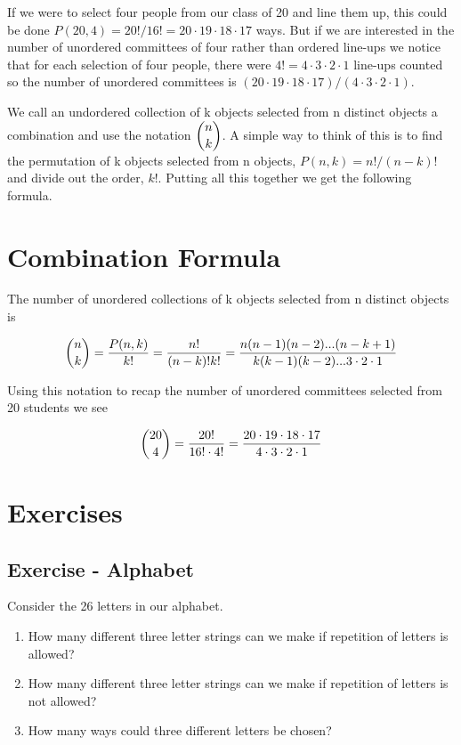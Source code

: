 \documentclass[]{book}
\theoremstyle{definition}
\theoremstyle{definition}
\theoremstyle{definition}
\theoremstyle{remark}
\begin{document}
If we were to select four people from our class of 20 and line them up,
this could be done \(P(20,4)=20!/16!=20 \cdot 19 \cdot 18 \cdot 17\)
ways. But if we are interested in the number of unordered committees of
four rather than ordered line-ups we notice that for each selection of
four people, there were \(4!=4 \cdot 3 \cdot 2 \cdot 1\) line-ups
counted so the number of unordered committees is
\((20 \cdot 19 \cdot 18 \cdot 17)/(4 \cdot 3 \cdot 2 \cdot 1)\).

We call an undordered collection of k objects selected from n distinct
objects a combination and use the notation \(\dbinom{n}{k}\). A simple
way to think of this is to find the permutation of k objects selected
from n objects, \(P(n,k)=n!/(n-k)!\) and divide out the order, \(k!\).
Putting all this together we get the following formula.

\section{Combination Formula}\label{combination-formula}

The number of unordered collections of k objects selected from n
distinct objects is

\[\dbinom{n}{k}=\frac{P(n,k)}{k!}=\frac{n!}{(n-k)!k!}=
\frac{n(n-1)(n-2)...(n-k+1)}{k(k-1)(k-2)...3 \cdot 2 \cdot 1}\]

Using this notation to recap the number of unordered committees selected
from 20 students we see

\[\dbinom{20}{4}=\frac{20!}{16! \cdot 4!}=\frac{20 \cdot 19 \cdot 18 \cdot 17}{4 \cdot 3 \cdot 2 \cdot 1}\]

\section{Exercises}\label{exercises}

\subsection{Exercise - Alphabet}\label{exercise---alphabet}

Consider the 26 letters in our alphabet.

\begin{enumerate}
\def\labelenumi{(\alph{enumi})}
\item
  How many different three letter strings can we make if repetition of
  letters is allowed?
\item
  How many different three letter strings can we make if repetition of
  letters is not allowed?
\item
  How many ways could three different letters be chosen?
\end{enumerate}
\end{document}
